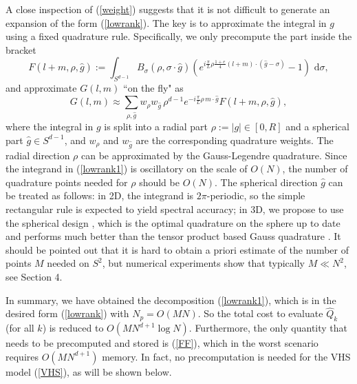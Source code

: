 \documentclass[review,times]{elsarticle}
\newcommand{\rd}{\,\mathrm{d}}
\begin{document}
A close inspection of (\ref{weight}) suggests that it is not difficult to generate an expansion of the form (\ref{lowrank}). The key is to approximate the integral in $g$ using a fixed quadrature rule. Specifically, we only precompute the part inside the bracket
\begin{equation} \label{FF}
F(l+m,\rho,\hat{g}):=\int_{S^{d-1}}B_{\sigma}(\rho,\sigma\cdot \hat{g})\left(e^{i\frac{\pi}{L}\rho \frac{1+e}{4}(l+m)\cdot (\hat{g}-\sigma)}-1\right)\,\rd{\sigma},
\end{equation}
and approximate $G(l,m)$ ``on the fly" as
\begin{equation} \label{lowrank1}
G(l,m)\approx \sum_{\rho, \hat{g}}w_{\rho}w_{\hat{g}}\, \rho^{d-1} e^{-i\frac{\pi}{L}\rho\, m \cdot \hat{g}} F(l+m,\rho,\hat{g}),
\end{equation}
where the integral in $g$ is split into a radial part $\rho:=|g|\in [0,R]$ and a spherical part $\hat{g}\in S^{d-1}$, and $w_{\rho}$ and $w_{\hat{g}}$ are the corresponding quadrature weights. The radial direction $\rho$ can be approximated by the Gauss-Legendre quadrature. Since the integrand in (\ref{lowrank1}) is oscillatory on the scale of $O(N)$, the number of quadrature points needed for $\rho$ should be $O(N)$. The spherical direction $\hat{g}$ can be treated as follows: in 2D, the integrand is $2\pi$-periodic, so the simple rectangular rule is expected to yield spectral accuracy; in 3D, we propose to use the spherical design \cite{Womersley}, which is the optimal quadrature on the sphere up to date and performs much better than the tensor product based Gauss quadrature \cite{Beentjes15}. It should be pointed out that it is hard to obtain a priori estimate of the number of points $M$ needed on $S^2$, but numerical experiments show that typically $M\ll N^2$, see Section 4.

In summary, we have obtained the decomposition (\ref{lowrank1}), which is in the desired form (\ref{lowrank}) with $N_p=O(MN)$. So the total cost to evaluate $\hat{Q}_k$ (for all $k$) is reduced to $O(MN^{d+1}\log N)$. Furthermore, the only quantity that needs to be precomputed and stored is (\ref{FF}), which in the worst scenario requires $O(MN^{d+1})$ memory. In fact, no precomputation is needed for the VHS model (\ref{VHS}), as will be shown below.
\end{document}
